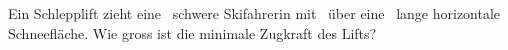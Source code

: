 Ein Schlepplift zieht eine \mSkO\ schwere Skifahrerin mit \vLiO\ über eine \sLiO\ lange horizontale Schneefläche. Wie gross ist die minimale Zugkraft des Lifts?

